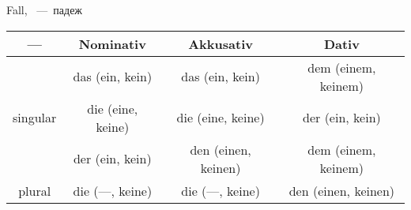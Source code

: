 
 Fall, ~---~падеж

\begin{tabular}{|c|c|c|c|}
\hline
--- & Nominativ & Akkusativ & Dativ \\
\hline
\multirow{3}{*}{singular} & das (ein, kein) & das (ein, kein) & dem (einem, keinem) \\
 & die (eine, keine) & die (eine, keine) & der (ein, kein) \\
 & der (ein, kein) & den (einen, keinen) & dem (einem, keinem) \\
\hline
plural & die (---, keine) & die (---, keine) & den (einen, keinen) \\
\hline
\end{tabular}
